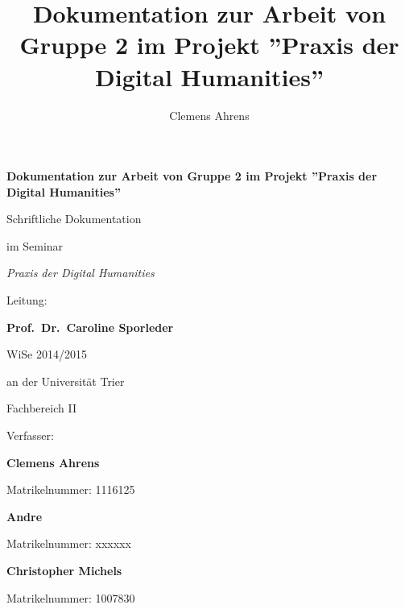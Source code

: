 \documentclass[a4paper,12pt,titlepage=true, ngerman]{scrartcl}
\title{Dokumentation zur Arbeit von Gruppe 2 im Projekt ''Praxis der Digital Humanities''} %
\author{Clemens Ahrens}
\begin{document}
\begin{titlepage}

\begin{center}

\vspace*{100pt}

\textbf{\Large{Dokumentation zur Arbeit von Gruppe 2 im Projekt ''Praxis der Digital Humanities''}}%

\vfill

Schriftliche Dokumentation

im Seminar

\emph{Praxis der Digital Humanities}


Leitung:

\textbf{Prof.\ Dr.\ Caroline Sporleder}%

WiSe 2014/2015%

\bigskip
\bigskip

an der Universität Trier

Fachbereich II

\bigskip

\bigskip

Verfasser:


\textbf{Clemens Ahrens}

Matrikelnummer: 1116125

\textbf{Andre} %

Matrikelnummer: xxxxxx

\textbf{Christopher Michels} %

Matrikelnummer: 1007830



\vfill

\end{center}

\end{titlepage}







\newpage

 \tableofcontents%
\end{document}
